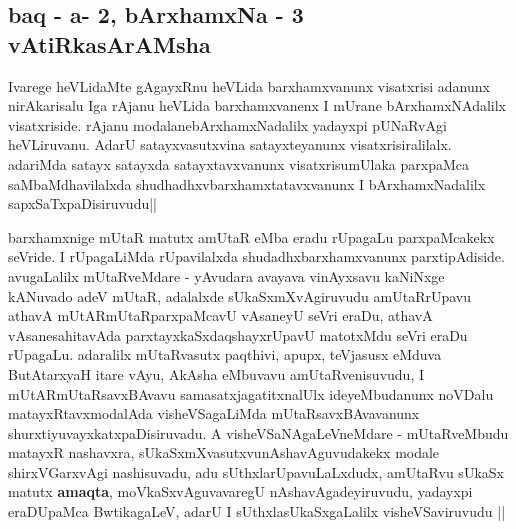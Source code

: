 \begin{center}

\section*{baq - a- 2, bArxhamxNa - 3 vAtiRkasArAMsha}

\bigskip

\end{center}

\begin{artha}
 Ivarege heVLidaMte gAgayxRnu heVLida barxhamxvanunx visatxrisi
 adanunx nirAkarisalu Iga rAjanu heVLida barxhamxvanenx I mUrane
 bArxhamxNAdalilx visatxriside. rAjanu modalanebArxhamxNadalilx
 yadayxpi pUNaRvAgi heVLiruvanu. AdarU satayxvasutxvina satayxteyanunx
 visatxrisiralilalx. adariMda satayx satayxda satayxtavxvanunx
 visatxrisumUlaka parxpaMca saMbaMdhavilalxda
 shudhadhxvbarxhamxtatavxvanunx I bArxhamxNadalilx sapxSaTxpaDisiruvudu||
\end{artha}

\begin{center}


\end{center}


\begin{artha}
barxhamxnige mUtaR matutx amUtaR eMba eradu rUpagaLu parxpaMcakekx
seVride. I rUpagaLiMda rUpavilalxda shudadhxbarxhamxvanunx
parxtipAdiside. avugaLalilx mUtaRveMdare - yAvudara avayava vinAyxsavu
kaNiNxge kANuvado adeV mUtaR, adalalxde sUkaSxmXvAgiruvudu
amUtaRrUpavu athavA mUtARmUtaRparxpaMcavU vAsaneyU seVri eraDu, athavA
vAsanesahitavAda parxtayxkaSxdaqshayxrUpavU matotxMdu seVri eraDu
rUpagaLu. adaralilx  mUtaRvasutx paqthivi, apupx, teVjasusx eMduva
ButAtarxyaH itare vAyu, AkAsha eMbuvavu amUtaRvenisuvudu, I
mUtARmUtaRsavxBAvavu samasatxjagatitxnalUlx ideyeMbudanunx noVDalu
matayxRtavxmodalAda visheVSagaLiMda mUtaRsavxBAvavanunx
shurxtiyuvayxkatxpaDisiruvadu. A visheVSaNAgaLeVneMdare - mUtaRveMbudu
matayxR nashavxra, sUkaSxmXvasutxvunAshavAguvudakekx modale
shirxVGarxvAgi nashisuvadu, adu sUthxlarUpavuLaLxdudx, amUtaRvu sUkaSx
matutx \textbf{amaqta}, moVkaSxvAguvavaregU nAshavAgadeyiruvudu,
yadayxpi eraDUpaMca BwtikagaLeV, adarU I sUthxlasUkaSxgaLalilx
visheVSaviruvudu ||
\end{artha}

